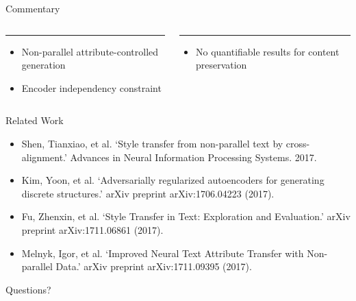 \documentclass{beamer}
\begin{document}
\begin{frame}{Commentary}
	\begin{columns}[T] %
		\begin{column}{.48\textwidth}
			\color{tropicalrainforest}\rule{\linewidth}{4pt}
			\begin{itemize}
				\item Non-parallel attribute-controlled generation
				\item Encoder independency constraint
			\end{itemize}
		\end{column}
		\hfill
		\begin{column}{.48\textwidth}
			\color{usccardinal}\rule{\linewidth}{4pt}
			\begin{itemize}
				\item No quantifiable results for content preservation
			\end{itemize}
		\end{column}
	\end{columns}
\end{frame}

\begin{frame}{Related Work}
	\begin{itemize}
		\item Shen, Tianxiao, et al. `Style transfer from non-parallel text by cross-alignment.' Advances in Neural Information Processing Systems. 2017.
		\item Kim, Yoon, et al. `Adversarially regularized autoencoders for generating discrete structures.' arXiv preprint arXiv:1706.04223 (2017).
		\item Fu, Zhenxin, et al. `Style Transfer in Text: Exploration and Evaluation.' arXiv preprint arXiv:1711.06861 (2017).
		\item Melnyk, Igor, et al. `Improved Neural Text Attribute Transfer with Non-parallel Data.' arXiv preprint arXiv:1711.09395 (2017).
	\end{itemize}
\end{frame}

\begin{frame}
	\centering
	\Huge{Questions?}
\end{frame}
\end{document}
